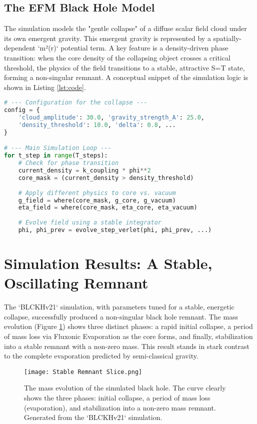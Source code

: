 \documentclass[11pt, twoside]{article}
\begin{document}
\subsection{The EFM Black Hole Model}
The simulation models the "gentle collapse" of a diffuse scalar field cloud under its own emergent gravity. This emergent gravity is represented by a spatially-dependent `m²(r)` potential term. A key feature is a density-driven phase transition: when the core density of the collapsing object crosses a critical threshold, the physics of the field transitions to a stable, attractive S=T state, forming a non-singular remnant. A conceptual snippet of the simulation logic is shown in Listing \ref{lst:code}.

\begin{lstlisting}[language=Python, caption={Conceptual Simulation Snippet for the EFM Black Hole}, label={lst:code}, basicstyle=\ttfamily\scriptsize, frame=single, breaklines=true]
# --- Configuration for the collapse ---
config = {
    'cloud_amplitude': 30.0, 'gravity_strength_A': 25.0,
    'density_threshold': 10.0, 'delta': 0.8, ...
}

# --- Main Simulation Loop ---
for t_step in range(T_steps):
    # Check for phase transition
    current_density = k_coupling * phi**2
    core_mask = (current_density > density_threshold)
    
    # Apply different physics to core vs. vacuum
    g_field = where(core_mask, g_core, g_vacuum)
    eta_field = where(core_mask, eta_core, eta_vacuum)
    
    # Evolve field using a stable integrator
    phi, phi_prev = evolve_step_verlet(phi, phi_prev, ...)
\end{lstlisting}

\section{Simulation Results: A Stable, Oscillating Remnant}
The `BLCKHv21` simulation, with parameters tuned for a stable, energetic collapse, successfully produced a non-singular black hole remnant. The mass evolution (Figure \ref{fig:bh_lifecycle}) shows three distinct phases: a rapid initial collapse, a period of mass loss via Fluxonic Evaporation as the core forms, and finally, stabilization into a stable remnant with a non-zero mass. This result stands in stark contrast to the complete evaporation predicted by semi-classical gravity.

\begin{figure}[h!]
    \centering
    \texttt{[image: Stable Remnant Slice.png]}
    \caption{The mass evolution of the simulated black hole. The curve clearly shows the three phases: initial collapse, a period of mass loss (evaporation), and stabilization into a non-zero mass remnant. Generated from the `BLCKHv21` simulation.}
    \label{fig:bh_lifecycle}
\end{figure}
\end{document}
